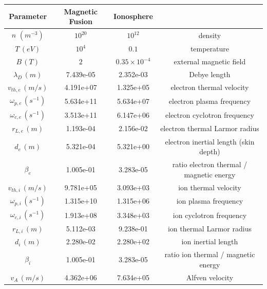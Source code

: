 \documentclass[english]{article}
\newcommand{\xr}{L_{\mathrm{ref}}}
\newcommand{\nr}{n_{\mathrm{ref}}}
\newcommand{\qr}{q_{\mathrm{ref}}}
\newcommand{\Tr}{T_{\mathrm{ref}}}
\newcommand{\mr}{m_{\mathrm{ref}}}
\newcommand{\betar}{\beta_{\mathrm{ref}}}
\newcommand{\vr}{v_{\mathrm{ref}}}
\newcommand{\omr}{\omega_{\mathrm{ref}}}
\newcommand{\epsr}{\varepsilon_{\mathrm{ref}}}
\begin{document}
\begin{tabular}{c|c|c|c}
		 Parameter & Magnetic Fusion & Ionosphere & \\\hline 
		$n$ $(m^{-3})$ &$10^{20}$ & $10^{12} $ & density\\
		$T\,(eV)$  &$10^4$ & $0.1$ & temperature\\
		$B\, (T)$  & $2$ & $0.35\times 10^{-4}$ & external magnetic field\\
		$\lambda_D\,(m)$ & 7.439e-05& 2.352e-03  & Debye length\\
		$v_{th,e}\,(m/s)$   &4.191e+07  & 1.325e+05  & electron thermal velocity\\
		$\omega_{p,e}\,(s^{-1})$ & 5.634e+11& 5.634e+07  & electron plasma frequency\\
		$\omega_{c,e}\,(s^{-1})$ & 3.513e+11& 6.147e+06  & electron cyclotron frequency\\
		$r_{L,e}\,(m)$   & 1.193e-04 & 2.156e-02  & electron thermal Larmor radius\\
		$d_e\,(m)$    & 5.321e-04 & 5.321e+00  & electron inertial length  (skin depth)\\
		$\beta_e$ & 1.005e-01 & 3.283e-05  & ratio electron thermal / magnetic energy\\
		$v_{th,i}\,(m/s)$ &  9.781e+05 & 3.093e+03  & ion thermal velocity\\
		$\omega_{p,i}\,(s^{-1})$ & 1.315e+10& 1.315e+06  & ion plasma frequency\\
		$\omega_{c,i}\,(s^{-1})$ & 1.913e+08& 3.348e+03  & ion cyclotron frequency\\
		$r_{L,i}\,(m)$  &  5.112e-03 & 9.238e-01  & ion thermal Larmor radius\\
		$d_i\,(m)$  &  2.280e-02  & 2.280e+02  & ion inertial length\\
		$\beta_i$  & 1.005e-01 & 3.283e-05  & ratio ion thermal / magnetic energy\\
		$v_A\,(m/s)$   &  4.362e+06 & 7.634e+05  &Alfven velocity \\
\end{tabular}






\end{document}
